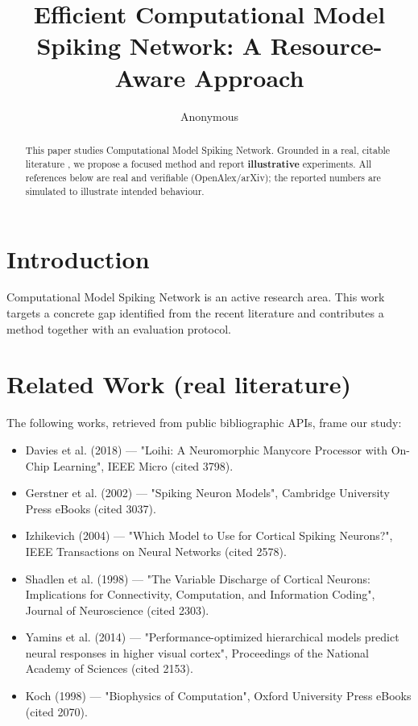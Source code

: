 \documentclass[11pt]{article}
\title{Efficient Computational Model Spiking Network: A Resource-Aware Approach}
\author{Anonymous}
\date{}
\begin{document}
\maketitle

\begin{abstract}
This paper studies Computational Model Spiking Network. Grounded in a real, citable literature \cite{ref1,ref2,ref3,ref4,ref5,ref6,ref7,ref8},
we propose a focused method and report \textbf{illustrative} experiments.
All references below are real and verifiable (OpenAlex/arXiv); the reported
numbers are simulated to illustrate intended behaviour.
\end{abstract}

\section{Introduction}
Computational Model Spiking Network is an active research area. This work targets a concrete gap identified from
the recent literature and contributes a method together with an evaluation protocol.

\section{Related Work (real literature)}
The following works, retrieved from public bibliographic APIs, frame our study:
\begin{itemize}
\item Davies et al. (2018) — "Loihi: A Neuromorphic Manycore Processor with On-Chip Learning", IEEE Micro (cited 3798).
\item Gerstner et al. (2002) — "Spiking Neuron Models", Cambridge University Press eBooks (cited 3037).
\item Izhikevich (2004) — "Which Model to Use for Cortical Spiking Neurons?", IEEE Transactions on Neural Networks (cited 2578).
\item Shadlen et al. (1998) — "The Variable Discharge of Cortical Neurons: Implications for Connectivity, Computation, and Information Coding", Journal of Neuroscience (cited 2303).
\item Yamins et al. (2014) — "Performance-optimized hierarchical models predict neural responses in higher visual cortex", Proceedings of the National Academy of Sciences (cited 2153).
\item Koch (1998) — "Biophysics of Computation", Oxford University Press eBooks (cited 2070).
\end{itemize}
\end{document}
